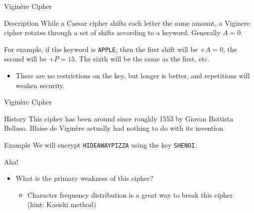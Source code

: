 \documentclass{beamer}
\begin{document}
\begin{frame}{Vigin\`ere Cipher}
	\begin{block}{Description}
		While a Caesar cipher shifts each letter the same amount, a Viginere
		cipher rotates through a set of shifts according to a keyword. Generally
		$A=0$.
	\end{block}

	For example, if the keyword is {\tt APPLE}, then the first shift will be
	$+A = 0$, the second will be $+P = 15$. The sixth will be the same as the
	first, etc.

	\begin{itemize}
		\item There are no restrictions on the key, but longer is better, and repetitions
	will weaken security.
	\end{itemize}
\end{frame}

\begin{frame}{Vigin\`ere Cipher}
	\begin{block}{History}
		This cipher has been around since roughly 1553 by Giovan Battista
		Bellaso. Blaise de Vigin\`ere actually had nothing to do with its
		invention.
	\end{block}
	\begin{block}{Example}
		We will encrypt {\tt HIDEAWAYPIZZA} using the key {\tt SHENOI}.
			
	\end{block}
	\begin{block}{Aha!}
		\begin{itemize}
			\item What is the primary weakness of this cipher?
			\begin{itemize}
				\item Character frequency distribution is a great way to break this cipher. (hint: Kasiski method)
			\end{itemize}
		\end{itemize}
	\end{block}
\end{frame}
\end{document}
